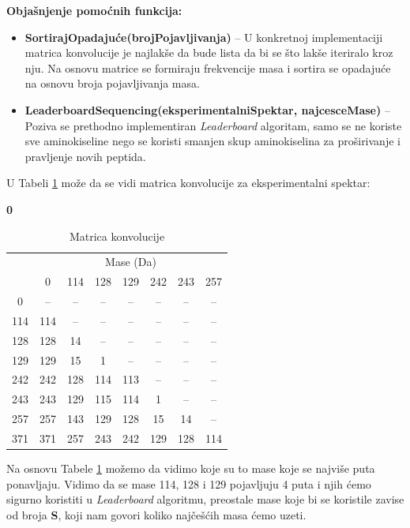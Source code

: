 \documentclass[12pt,oneside]{memoir}
\begin{document}
\noindent
\textbf{Objašnjenje pomoćnih funkcija:}
\begin{itemize}
    \item \textbf{SortirajOpadajuće(brojPojavljivanja)} – U konkretnoj implementaciji matrica konvolucije je najlakše da bude lista da bi se što lakše iteriralo kroz nju. Na osnovu matrice se formiraju frekvencije masa i sortira se opadajuće na osnovu broja pojavljivanja masa.
    \item \textbf{LeaderboardSequencing(eksperimentalniSpektar, najcesceMase)} – Poziva se prethodno implementiran \emph{Leaderboard} algoritam, samo se ne koriste sve aminokiseline nego se koristi smanjen skup aminokiselina za proširivanje i pravljenje novih peptida.
\end{itemize}

U Tabeli \ref{tab:convolution_matrix} može da se vidi matrica konvolucije za eksperimentalni spektar:
\begin{center}
{\bfseries 0       }
\end{center}

\begin{table}[h]
\centering
\renewcommand{\arraystretch}{1.3}
\begin{tabular}{|c|c|c|c|c|c|c|c|}
\hline
\multirow{2}{*}{} & \multicolumn{7}{c|}{Mase (Da)} \\ \cline{2-8}
 & 0 & 114 & 128 & 129 & 242 & 243 & 257 \\ \hline
0 & -- & -- & -- & -- & -- & -- & -- \\ \hline
114 & 114 & -- & -- & -- & -- & -- & -- \\ \hline
128 & 128 & 14 & -- & -- & -- & -- & -- \\ \hline
129 & 129 & 15 & 1 & -- & -- & -- & -- \\ \hline
242 & 242 & 128 & 114 & 113 & -- & -- & -- \\ \hline
243 & 243 & 129 & 115 & 114 & 1 & -- & -- \\ \hline
257 & 257 & 143 & 129 & 128 & 15 & 14 & -- \\ \hline
371 & 371 & 257 & 243 & 242 & 129 & 128 & 114 \\ \hline
\end{tabular}
\caption{Matrica konvolucije}
\label{tab:convolution_matrix}
\end{table}

Na osnovu Tabele \ref{tab:convolution_matrix} možemo da vidimo koje su to mase koje se najviše puta ponavljaju. Vidimo da se mase 114, 128 i 129 pojavljuju 4 puta i njih ćemo sigurno koristiti u \emph{Leaderboard} algoritmu, preostale mase koje bi se koristile zavise od broja \textbf{S}, koji nam govori koliko najčešćih masa ćemo uzeti.
\end{document}
